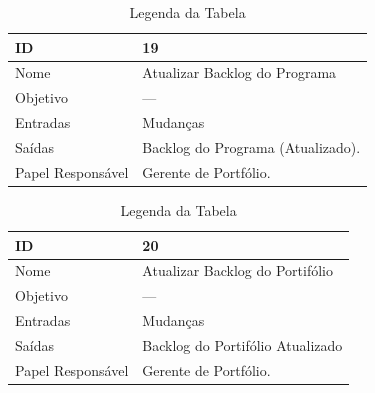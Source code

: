 \begin{table}[H]
  \centering
    \begin{tabular}{| m{5em} | m{10cm} |}
      \hline
      ID       & 19   \\ \hline
      Nome     & Atualizar Backlog do Programa  \\ \hline
      Objetivo & ---  \\ \hline
      Entradas & Mudanças\\ \hline
      Saídas   & Backlog do Programa (Atualizado). \\ \hline
      Papel Responsável   & Gerente de Portfólio. \\ \hline
    \end{tabular}
    \caption{Legenda da Tabela}
    \label{tabela:atividade19}
\end{table}

\begin{table}[H]
  \centering
    \begin{tabular}{| m{5em} | m{10cm} |}
      \hline
      ID       & 20   \\ \hline
      Nome     & Atualizar Backlog do Portifólio  \\ \hline
      Objetivo & ---  \\ \hline
      Entradas & Mudanças \\ \hline
      Saídas   & Backlog do Portifólio Atualizado \\ \hline
      Papel Responsável   & Gerente de Portfólio. \\ \hline
    \end{tabular}
    \caption{Legenda da Tabela}
    \label{tabela:atividade20}
\end{table}
